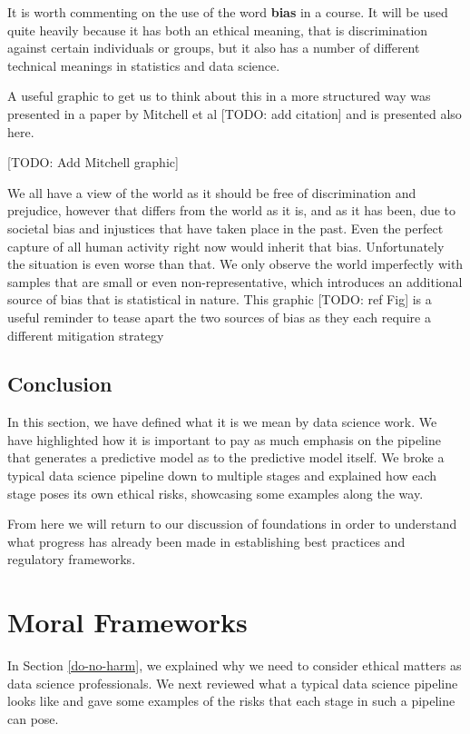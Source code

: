 \documentclass[
]{book}
\theoremstyle{definition}
\theoremstyle{definition}
\theoremstyle{definition}
\theoremstyle{definition}
\theoremstyle{remark}
\begin{document}
It is worth commenting on the use of the word \textbf{bias} in a course. It will be used quite heavily because it has both an ethical meaning, that is discrimination against certain individuals or groups, but it also has a number of different technical meanings in statistics and data science.

A useful graphic to get us to think about this in a more structured way was presented in a paper by Mitchell et al {[}TODO: add citation{]} and is presented also here.

{[}TODO: Add Mitchell graphic{]}

We all have a view of the world as it should be free of discrimination and prejudice, however that differs from the world as it is, and as it has been, due to societal bias and injustices that have taken place in the past. Even the perfect capture of all human activity right now would inherit that bias. Unfortunately the situation is even worse than that. We only observe the world imperfectly with samples that are small or even non-representative, which introduces an additional source of bias that is statistical in nature. This graphic {[}TODO: ref Fig{]} is a useful reminder to tease apart the two sources of bias as they each require a different mitigation strategy

\hypertarget{conclusion-1}{%
\subsection{Conclusion}\label{conclusion-1}}

In this section, we have defined what it is we mean by data science work. We have highlighted how it is important to pay as much emphasis on the pipeline that generates a predictive model as to the predictive model itself. We broke a typical data science pipeline down to multiple stages and explained how each stage poses its own ethical risks, showcasing some examples along the way.

From here we will return to our discussion of foundations in order to understand what progress has already been made in establishing best practices and regulatory frameworks.

\hypertarget{moral-frameworks}{%
\section{Moral Frameworks}\label{moral-frameworks}}

In Section \ref{do-no-harm}, we explained why we need to consider ethical matters as data science professionals. We next reviewed what a typical data science pipeline looks like and gave some examples of the risks that each stage in such a pipeline can pose.
\end{document}
